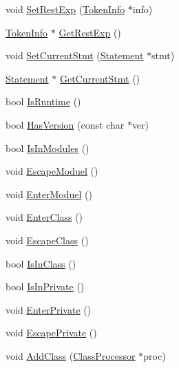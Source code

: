 \begin{DoxyCompactItemize}
\item 
void \hyperlink{classmocha_1_1_visitor_info_ac0deab6c0b23e0f4b489db2a7dbebb60}{SetRestExp} (\hyperlink{classmocha_1_1_token_info}{TokenInfo} $\ast$info)
\item 
\hyperlink{classmocha_1_1_token_info}{TokenInfo} $\ast$ \hyperlink{classmocha_1_1_visitor_info_a4730585ad730c164e78d15520640322c}{GetRestExp} ()
\item 
void \hyperlink{classmocha_1_1_visitor_info_a8fa66ab61209f68899be1bbb4c56657c}{SetCurrentStmt} (\hyperlink{classmocha_1_1_statement}{Statement} $\ast$stmt)
\item 
\hyperlink{classmocha_1_1_statement}{Statement} $\ast$ \hyperlink{classmocha_1_1_visitor_info_a60fd8ce138f8e41d8694c349b741cb64}{GetCurrentStmt} ()
\item 
bool \hyperlink{classmocha_1_1_visitor_info_a1b99640b068c9940234bca6772d031d5}{IsRuntime} ()
\item 
bool \hyperlink{classmocha_1_1_visitor_info_a8c350b217e1cb43d6cff9343ee1987eb}{HasVersion} (const char $\ast$ver)
\item 
bool \hyperlink{classmocha_1_1_visitor_info_ae797bb8ec303f9b8d472fc1d2c24f44e}{IsInModules} ()
\item 
void \hyperlink{classmocha_1_1_visitor_info_af0ae796981d64ed2e425ad66b904a770}{EscapeModuel} ()
\item 
void \hyperlink{classmocha_1_1_visitor_info_ab69605a32d04b6c8dbfd701f93d608cb}{EnterModuel} ()
\item 
void \hyperlink{classmocha_1_1_visitor_info_a02ea1a78ba9f294f488e665393096c14}{EnterClass} ()
\item 
void \hyperlink{classmocha_1_1_visitor_info_afa9d5ce20536cad5990c43ab9625b554}{EscapeClass} ()
\item 
bool \hyperlink{classmocha_1_1_visitor_info_ae331bf48b9cece454529ea9d7e74dfc2}{IsInClass} ()
\item 
bool \hyperlink{classmocha_1_1_visitor_info_a08bba415f2901f87b924cf351a9895af}{IsInPrivate} ()
\item 
void \hyperlink{classmocha_1_1_visitor_info_a09618fd0fdcf2458086b857c328372a6}{EnterPrivate} ()
\item 
void \hyperlink{classmocha_1_1_visitor_info_aa0750a6159e978164f92a3c84d89ea5a}{EscapePrivate} ()
\item 
void \hyperlink{classmocha_1_1_visitor_info_a010f1909725f3bee0112d71ac592d0c4}{AddClass} (\hyperlink{classmocha_1_1_class_processor}{ClassProcessor} $\ast$proc)
\item 

\end{DoxyCompactItemize}
